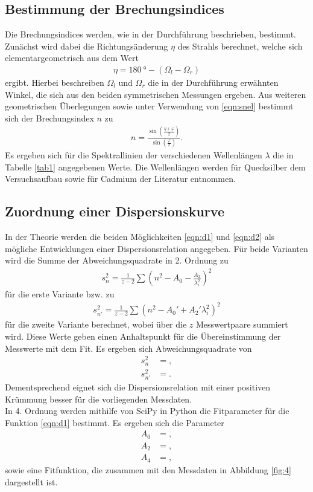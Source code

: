 \subsection{Bestimmung der Brechungsindices}
Die Brechungsindices werden, wie in der Durchführung beschrieben, bestimmt.
Zunächst wird dabei die Richtungsänderung $\eta$ des Strahls berechnet, welche sich elementargeometrisch aus dem Wert
\begin{align}
  \eta = \SI{180}{\degree}-(\Omega_l - \Omega_r)
\end{align}
ergibt.
Hierbei beschreiben $\Omega_l$ und $\Omega_r$ die in der Durchführung erwähnten Winkel, die sich aus den beiden symmetrischen Messungen ergeben.
Aus weiteren geometrischen Überlegungen sowie unter Verwendung von \eqref{eqn:snel} bestimmt sich der Brechungsindex $n$ zu
\begin{align}
  n = \frac{\sin{(\frac{\eta + \varphi}{2})}}{\sin{(\frac{\varphi}{2})}}.
\end{align}
Es ergeben sich für die Spektrallinien der verschiedenen Wellenlängen $\lambda$ die in Tabelle \ref{tab1} angegebenen Werte.
Die Wellenlängen werden für Quecksilber dem Versuchsaufbau sowie für Cadmium der Literatur \cite{cd} entnommen.
    

\subsection{Zuordnung einer Dispersionskurve}
In der Theorie werden die beiden Möglichkeiten \eqref{eqn:d1} und \eqref{eqn:d2} als mögliche Entwicklungen einer Dispersionsrelation angegeben.
Für beide Varianten wird die Summe der Abweichungsquadrate in 2. Ordnung zu
\begin{align*}
  s_n^2 = \frac{1}{z-2} \sum ( n^2 - A_0 - \frac{A_2}{\lambda_i^2} )^2
\end{align*}
für die erste Variante bzw. zu
\begin{align*}
  s_{n'}^2 = \frac{1}{z-2} \sum ( n^2 - A_0' + A_2' \lambda_i^2 )^2
\end{align*}
für die zweite Variante berechnet, wobei über die $z$ Messwertpaare summiert wird.
Diese Werte geben einen Anhaltspunkt für die Übereinstimmung der Messwerte mit dem Fit.
Es ergeben sich Abweichungsquadrate von
\begin{align*}
  s_n^2 &= ,\\
  s_{n'}^2 &= .
\end{align*}
Dementsprechend eignet sich die Dispersionsrelation mit einer positiven Krümmung besser für die vorliegenden Messdaten.\\
In 4. Ordnung werden mithilfe von SciPy in Python die Fitparameter für die Funktion \eqref{eqn:d1} bestimmt.
Es ergeben sich die Parameter
\begin{align*}
A_0 &= ,\\
A_2 &= ,\\
A_4 &= ,
\end{align*}
sowie eine Fitfunktion, die zusammen mit den Messdaten in Abbildung \ref{fig:4} dargestellt ist.

